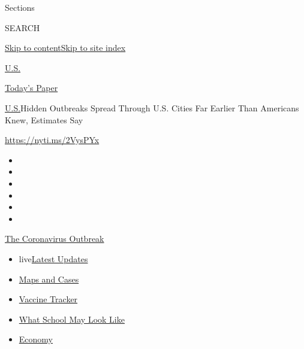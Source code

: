 Sections

SEARCH

\protect\hyperlink{site-content}{Skip to
content}\protect\hyperlink{site-index}{Skip to site index}

\href{https://www.nytimes.com/section/us}{U.S.}

\href{https://myaccount.nytimes.com/auth/login?response_type=cookie\&client_id=vi}{}

\href{https://www.nytimes.com/section/todayspaper}{Today's Paper}

\href{/section/us}{U.S.}\textbar{}Hidden Outbreaks Spread Through U.S.
Cities Far Earlier Than Americans Knew, Estimates Say

\url{https://nyti.ms/2VysPYx}

\begin{itemize}
\item
\item
\item
\item
\item
\item
\end{itemize}

\href{https://www.nytimes.com/news-event/coronavirus?action=click\&pgtype=Article\&state=default\&region=TOP_BANNER\&context=storylines_menu}{The
Coronavirus Outbreak}

\begin{itemize}
\tightlist
\item
  live\href{https://www.nytimes.com/2020/08/01/world/coronavirus-covid-19.html?action=click\&pgtype=Article\&state=default\&region=TOP_BANNER\&context=storylines_menu}{Latest
  Updates}
\item
  \href{https://www.nytimes.com/interactive/2020/us/coronavirus-us-cases.html?action=click\&pgtype=Article\&state=default\&region=TOP_BANNER\&context=storylines_menu}{Maps
  and Cases}
\item
  \href{https://www.nytimes.com/interactive/2020/science/coronavirus-vaccine-tracker.html?action=click\&pgtype=Article\&state=default\&region=TOP_BANNER\&context=storylines_menu}{Vaccine
  Tracker}
\item
  \href{https://www.nytimes.com/interactive/2020/07/29/us/schools-reopening-coronavirus.html?action=click\&pgtype=Article\&state=default\&region=TOP_BANNER\&context=storylines_menu}{What
  School May Look Like}
\item
  \href{https://www.nytimes.com/live/2020/07/31/business/stock-market-today-coronavirus?action=click\&pgtype=Article\&state=default\&region=TOP_BANNER\&context=storylines_menu}{Economy}
\end{itemize}

